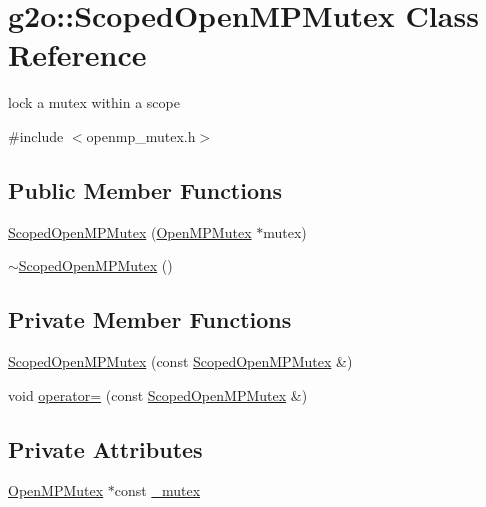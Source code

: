\hypertarget{classg2o_1_1_scoped_open_m_p_mutex}{}\section{g2o\+:\+:Scoped\+Open\+M\+P\+Mutex Class Reference}
\label{classg2o_1_1_scoped_open_m_p_mutex}


lock a mutex within a scope  




{\ttfamily \#include $<$openmp\+\_\+mutex.\+h$>$}

\subsection*{Public Member Functions}
\begin{DoxyCompactItemize}
\item 
\mbox{\hyperlink{classg2o_1_1_scoped_open_m_p_mutex_abb18bffae04b138447870b58ab158f56}{Scoped\+Open\+M\+P\+Mutex}} (\mbox{\hyperlink{classg2o_1_1_open_m_p_mutex}{Open\+M\+P\+Mutex}} $\ast$mutex)
\item 
\mbox{\hyperlink{classg2o_1_1_scoped_open_m_p_mutex_af3c190c5fba832ce48db9edf6ea10552}{$\sim$\+Scoped\+Open\+M\+P\+Mutex}} ()
\end{DoxyCompactItemize}
\subsection*{Private Member Functions}
\begin{DoxyCompactItemize}
\item 
\mbox{\hyperlink{classg2o_1_1_scoped_open_m_p_mutex_ab293e6a549bb2a546e53ebd9a1b7c2aa}{Scoped\+Open\+M\+P\+Mutex}} (const \mbox{\hyperlink{classg2o_1_1_scoped_open_m_p_mutex}{Scoped\+Open\+M\+P\+Mutex}} \&)
\item 
void \mbox{\hyperlink{classg2o_1_1_scoped_open_m_p_mutex_a9c41c4feafc825eae71097d2e6896fb5}{operator=}} (const \mbox{\hyperlink{classg2o_1_1_scoped_open_m_p_mutex}{Scoped\+Open\+M\+P\+Mutex}} \&)
\end{DoxyCompactItemize}
\subsection*{Private Attributes}
\begin{DoxyCompactItemize}
\item 
\mbox{\hyperlink{classg2o_1_1_open_m_p_mutex}{Open\+M\+P\+Mutex}} $\ast$const \mbox{\hyperlink{classg2o_1_1_scoped_open_m_p_mutex_a6fc0c5ebf1c40a7de6821f9ba78ea68f}{\+\_\+mutex}}
\end{DoxyCompactItemize}


